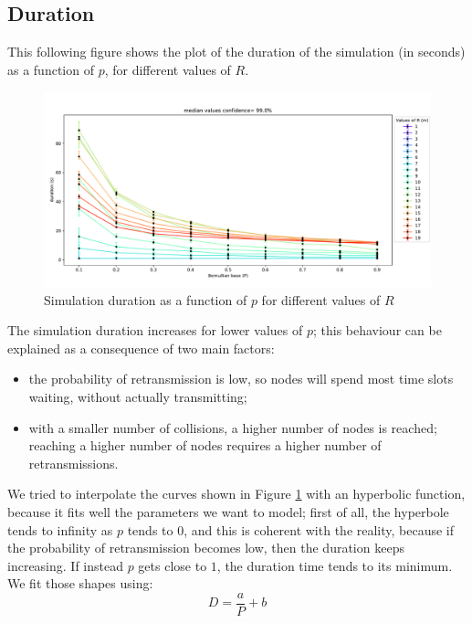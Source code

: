 \subsection{Duration}
This following figure shows the plot of the duration of the simulation (in
seconds) as a function of $p$, for different values of $R$.
\begin{figure}[H]
    \begin{center}
        \includegraphics[scale=.51]{img/Big_DurP_median.pdf}
    \end{center}
    \vspace*{-0.5cm}
    \caption{Simulation duration as a function of $p$ for different values of $R$}
    \label{fig:floorplancoverage3}
\end{figure}
\noindent
The simulation duration increases for lower values of $p$; this behaviour can be
explained as a consequence of two main factors:
\begin{itemize}
    \item the probability of retransmission is low, so nodes will spend most
    time slots waiting, without actually transmitting;
    \item with a smaller number of collisions, a higher number of nodes is
    reached; reaching a higher number of nodes requires a higher number of
    retransmissions.
\end{itemize}
We tried to interpolate the curves shown in Figure \ref{fig:floorplancoverage3}
with an hyperbolic function, because it fits well the parameters we want to
model; first of all, the hyperbole tends to infinity as $p$ tends to $0$, and
this is coherent with the reality, because if the probability of retransmission
becomes low, then the duration keeps increasing. If instead $p$ gets close to
$1$, the duration time tends to its minimum. We fit those shapes using:
\begin{equation*}  
    D = \frac{a}{P}+b 
\end{equation*}
